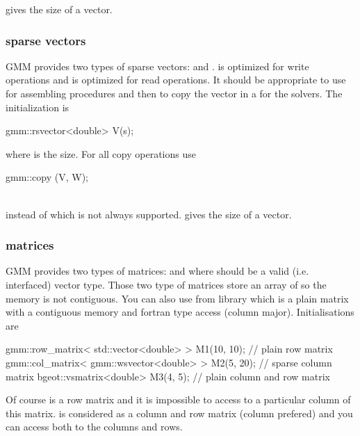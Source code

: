 \documentclass[11pt,a4paper]{article}
\begin{document}
 gives the size of a vector.

\subsubsection{sparse vectors}
GMM provides two types of sparse vectors:  and .  is optimized for write operations and  is optimized for read operations. It should be appropriate to use  for assembling procedures and then to copy the vector in a  for the solvers. The initialization is
\begin{cppcode}
  gmm::rsvector<double> V(s);
\end{cppcode}
where  is the size. For all copy operations use\\[0.2cm]
\begin{tt}
  gmm::copy (V, W);
\end{tt}\\[0.2cm]
instead of  which is not always supported.
 gives the size of a vector.

\subsubsection{matrices}
GMM provides two types of matrices:  and  where  should be a valid (i.e. interfaced) vector type.
Those two type of matrices store an array of  so the memory is not contiguous. You can also use  from  library which is a plain matrix with a contiguous memory and fortran type access (column major). Initialisations are
\begin{cppcode}
  gmm::row_matrix< std::vector<double> > M1(10, 10);  // plain row matrix
  gmm::col_matrix< gmm::wsvector<double> > M2(5, 20); // sparse column matrix
  bgeot::vsmatrix<double> M3(4, 5); // plain column and row matrix
\end{cppcode}
Of course  is a row matrix and it is impossible to access to a particular column of this matrix.  is considered as a column and row matrix (column prefered) and you can access both to the columns and rows.
\\
\end{document}

